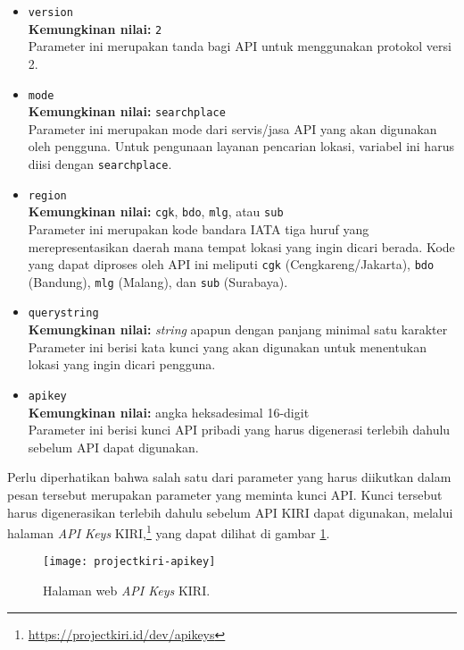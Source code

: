 \begin{itemize}
	\item \verb|version|\\
	\textbf{Kemungkinan nilai:} \verb|2|\\
	Parameter ini merupakan tanda bagi API untuk menggunakan protokol versi 2.
	\item \verb|mode|\\
	\textbf{Kemungkinan nilai:} \verb|searchplace|\\
	Parameter ini merupakan mode dari servis/jasa API yang akan digunakan oleh pengguna. Untuk pengunaan layanan pencarian lokasi, variabel ini harus diisi dengan \verb|searchplace|.
	\item \verb|region|\\
	\textbf{Kemungkinan nilai:} \verb|cgk|, \verb|bdo|, \verb|mlg|, atau \verb|sub|\\
	Parameter ini merupakan kode bandara IATA tiga huruf yang merepresentasikan daerah mana tempat lokasi yang ingin dicari berada. Kode yang dapat diproses oleh API ini meliputi \verb|cgk| (Cengkareng/Jakarta), \verb|bdo| (Bandung), \verb|mlg| (Malang), dan \verb|sub| (Surabaya).
	\newpage %
	\item \verb|querystring|\\
	\textbf{Kemungkinan nilai:} \textit{string} apapun dengan panjang minimal satu karakter\\
	Parameter ini berisi kata kunci yang akan digunakan untuk menentukan lokasi yang ingin dicari pengguna.
	\item \verb|apikey|\\
	\textbf{Kemungkinan nilai:} angka heksadesimal 16-digit\\
	Parameter ini berisi kunci API pribadi yang harus digenerasi terlebih dahulu sebelum API dapat digunakan.
\end{itemize}
\vspace{\baselineskip}
Perlu diperhatikan bahwa salah satu dari parameter yang harus diikutkan dalam pesan tersebut merupakan parameter yang meminta kunci API. Kunci tersebut harus digenerasikan terlebih dahulu sebelum API KIRI dapat digunakan, melalui halaman \textit{API Keys} KIRI,\footnote{\href{https://projectkiri.id/dev/apikeys}{https://projectkiri.id/dev/apikeys}} yang dapat dilihat di gambar \ref{fig:kiri-apikeypage}.

\begin{figure}[t]
    \centering
    \texttt{[image: projectkiri-apikey]}
    \caption[Halaman web \textit{API Keys} KIRI.]{Halaman web \textit{API Keys} KIRI.}
    \label{fig:kiri-apikeypage}
\end{figure}

